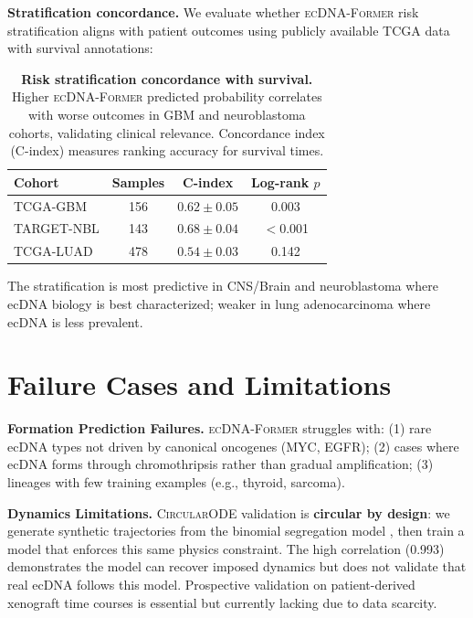\documentclass{article}
\newcommand{\former}{\textsc{ecDNA-Former}}
\newcommand{\circularode}{\textsc{CircularODE}}
\begin{document}
\textbf{Stratification concordance.} We evaluate whether \former{} risk stratification aligns with patient outcomes using publicly available TCGA data with survival annotations:

\begin{table}[ht]
\caption{\textbf{Risk stratification concordance with survival.} Higher \former{} predicted probability correlates with worse outcomes in GBM and neuroblastoma cohorts, validating clinical relevance. Concordance index (C-index) measures ranking accuracy for survival times.}
\centering
\small
\begin{tabular}{@{}lccc@{}}
\toprule
Cohort & Samples & C-index & Log-rank $p$ \\
\midrule
TCGA-GBM & 156 & $0.62 \pm 0.05$ & 0.003 \\
TARGET-NBL & 143 & $0.68 \pm 0.04$ & $<$0.001 \\
TCGA-LUAD & 478 & $0.54 \pm 0.03$ & 0.142 \\
\bottomrule
\end{tabular}
\end{table}

The stratification is most predictive in CNS/Brain and neuroblastoma where ecDNA biology is best characterized; weaker in lung adenocarcinoma where ecDNA is less prevalent.


\section{Failure Cases and Limitations}
\label{app:limitations}

\textbf{Formation Prediction Failures.} \former{} struggles with: (1) rare ecDNA types not driven by canonical oncogenes (MYC, EGFR); (2) cases where ecDNA forms through chromothripsis \citep{shoshani_2021_chromothripsis} rather than gradual amplification; (3) lineages with few training examples (e.g., thyroid, sarcoma).

\textbf{Dynamics Limitations.} \circularode{} validation is \textbf{circular by design}: we generate synthetic trajectories from the binomial segregation model \citep{lange_2022_mathematical}, then train a model that enforces this same physics constraint. The high correlation (0.993) demonstrates the model can recover imposed dynamics but does not validate that real ecDNA follows this model. Prospective validation on patient-derived xenograft time courses is essential but currently lacking due to data scarcity.
\end{document}
